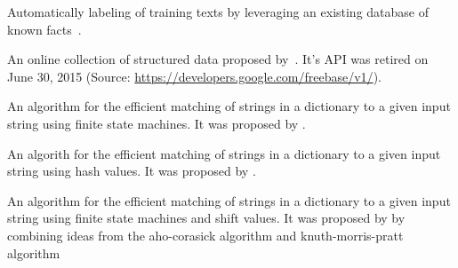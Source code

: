 
{%
  Automatically labeling of training texts by leveraging an existing database of known facts~\citep{reschke2014event}.
}

{%
  An online collection of structured data proposed by~\citep{bollacker2008freebase}.
  It's API was retired on June 30, 2015 (Source: \url{https://developers.google.com/freebase/v1/}).
}


{%
  An algorithm for the efficient matching of strings in a dictionary to a given input string using finite state machines.
  It was proposed by \citet{aho1975efficient}.
}

{%
  An algorith for the efficient matching of strings in a dictionary to a given input string using hash values.
  It was proposed by \citet{karp1987efficient}.
}

{%
  An algorithm for the efficient matching of strings in a dictionary to a given input string using finite state machines and shift values.
  It was proposed by \citet{commentz1979string} by combining ideas from the \gls{aho-corasick algorithm} and \gls{knuth-morris-pratt algorithm}
}

{%
}

